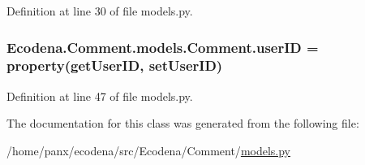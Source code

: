 Definition at line 30 of file models.py.

\hypertarget{class_ecodena_1_1_comment_1_1models_1_1_comment_a4de8b42ef11e406759040ca2a7c18d52}{
\subsubsection[{userID}]{\setlength{\rightskip}{0pt plus 5cm}Ecodena.Comment.models.Comment.userID = property(getUserID, setUserID)}}
\label{d9/d86/class_ecodena_1_1_comment_1_1models_1_1_comment_a4de8b42ef11e406759040ca2a7c18d52}


Definition at line 47 of file models.py.



The documentation for this class was generated from the following file:\begin{DoxyCompactItemize}
\item 
/home/panx/ecodena/src/Ecodena/Comment/\hyperlink{_comment_2models_8py}{models.py}\end{DoxyCompactItemize}
